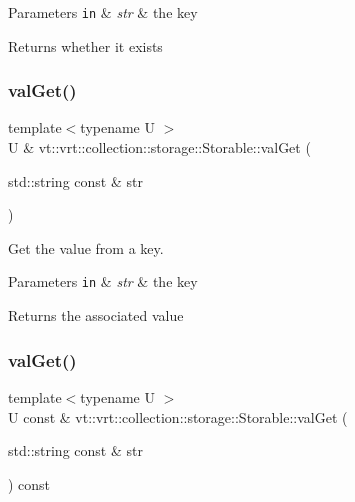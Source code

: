 \begin{DoxyParams}[1]{Parameters}
\mbox{\tt in}  & {\em str} & the key\\
\hline
\end{DoxyParams}
\begin{DoxyReturn}{Returns}
whether it exists 
\end{DoxyReturn}
\mbox{\label{structvt_1_1vrt_1_1collection_1_1storage_1_1_storable_a81a60463dff73c6375422344c8eb410c}} 
\subsubsection{\texorpdfstring{val\+Get()}{valGet()}\hspace{0.1cm}{\footnotesize\ttfamily [1/2]}}
{\footnotesize\ttfamily template$<$typename U $>$ \\
U \& vt\+::vrt\+::collection\+::storage\+::\+Storable\+::val\+Get (\begin{DoxyParamCaption}\item[{std\+::string const \&}]{str }\end{DoxyParamCaption})}



Get the value from a key. 


\begin{DoxyParams}[1]{Parameters}
\mbox{\tt in}  & {\em str} & the key\\
\hline
\end{DoxyParams}
\begin{DoxyReturn}{Returns}
the associated value 
\end{DoxyReturn}
\mbox{\label{structvt_1_1vrt_1_1collection_1_1storage_1_1_storable_a5014622ff587047270462efeca4ca2dd}} 
\subsubsection{\texorpdfstring{val\+Get()}{valGet()}\hspace{0.1cm}{\footnotesize\ttfamily [2/2]}}
{\footnotesize\ttfamily template$<$typename U $>$ \\
U const  \& vt\+::vrt\+::collection\+::storage\+::\+Storable\+::val\+Get (\begin{DoxyParamCaption}\item[{std\+::string const \&}]{str }\end{DoxyParamCaption}) const}



